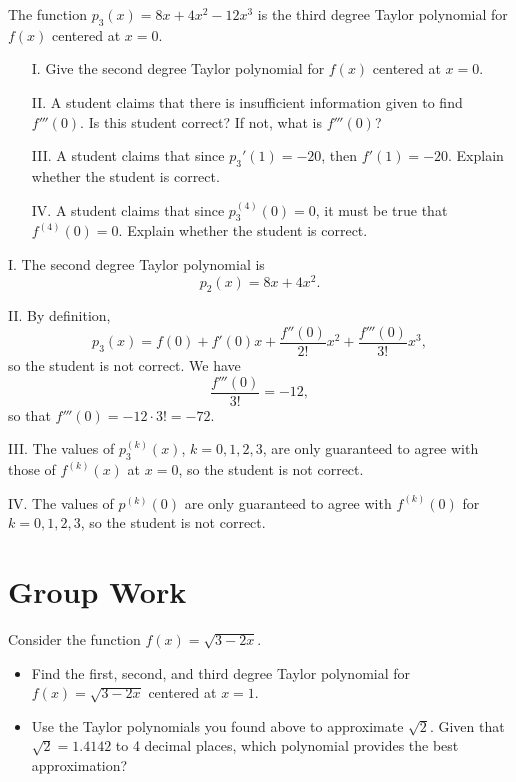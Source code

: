 \documentclass[]{ximera}
\begin{document}
\begin{problem} 
The function $p_3(x) = 8x+4x^2-12x^3$ is the third degree Taylor polynomial for $f(x)$ centered at $x=0$.  

\begin{itemize}
\item[I.] Give the second degree Taylor polynomial for $f(x)$ centered at $x=0$.
\item[II.] A student claims that there is insufficient information given to find $f'''(0)$.  Is this student correct?  If not, what is $f'''(0)$?
\item[III.] A student claims that since $p_3'(1)=-20$, then $f'(1)=-20$.  Explain whether the student is correct. 
\item[IV.] A student claims that since $p_3^{(4)}(0) =0$, it must be true that $f^{(4)}(0) =0$.  Explain whether the student is correct.  
\end{itemize}

\begin{solution}
I. The second degree Taylor polynomial is 
$$
p_2(x) = 8x+4x^2.
$$

II. By definition,
$$
p_3(x) = f(0) + f'(0)x + \frac{f''(0)}{2!}x^2 + \frac{f'''(0)}{3!} x^3,
$$
so the student is not correct. We have 
$$
\frac{f'''(0)}{3!} = -12,
$$
so that $f'''(0) = -12 \cdot 3! = -72$.

III. The values of $p_3^{(k)}(x)$, $k=0,1,2,3$, are only guaranteed to agree with those of $f^{(k)}(x)$ at $x=0$, so the student is not correct.

IV. The values of $p^{(k)}(0)$ are only guaranteed to agree with $f^{(k)}(0)$ for $k=0,1,2,3$, so the student is not correct.
\end{solution}
\end{problem}


\section{Group Work}


\begin{problem} 
Consider the function $f(x)=\sqrt{3-2x}$.

\begin{itemize}
\item Find the first, second, and third degree Taylor polynomial for $f(x)=\sqrt{3-2x}$ centered at $x=1$.
\item Use the Taylor polynomials you found above to approximate $\sqrt{2}$.  Given that $\sqrt{2} = 1.4142$ to 4 decimal places, which polynomial provides the best approximation?
\end{itemize}
\end{problem}
\end{document}
